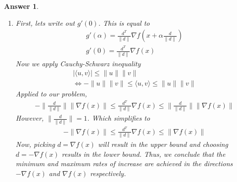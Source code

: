 \documentclass[12pt]{article}
\theoremstyle{colon}
\newtheorem*{answer}{Answer}
\begin{document}
\begin{answer}
\begin{enumerate}[label=\arabic*)]
\begin{enumerate}[label=\alph*)]
          A counterexample of this statement in $C^2$ is $f(x) = x^4$. We have that $x = 0$ is a strict local min since $f(\pm \epsilon) = \epsilon^4 > 0$. However, $\nabla^2 f(0) = 0$ which is not positive definite.
      \end{enumerate}

      \item First, lets write out $g'(0)$. This is equal to
        \begin{gather*}
          g'(\alpha) = \frac{d^T}{\lVert d \rVert} \nabla f \left(x + \alpha \frac{d}{\lVert d \rVert} \right) \\
          g'(0) = \frac{d^T}{\lVert d \rVert} \nabla f(x)
        \end{gather*}
        Now we apply Cauchy-Schwarz inequality
        \begin{gather*}
          \lvert \langle u, v \rangle \rvert \leq \lVert u \rVert \lVert v \rVert \\
          \Longleftrightarrow -\lVert u \rVert \lVert v \rVert \leq \langle u, v \rangle \leq \lVert u \rVert \lVert v \rVert
        \end{gather*}
        Applied to our problem,
        \begin{gather*}
          -\lVert \frac{d}{\lVert d \rVert} \rVert \lVert \nabla f(x) \rVert \leq \frac{d^T}{\lVert d \rVert} \nabla f(x) \leq \lVert \frac{d}{\lVert d \rVert} \rVert \lVert \nabla f(x) \rVert
        \end{gather*}
        However, $\lVert \frac{d}{\lVert d \rVert} \rVert = 1$. Which simplifies to
        \begin{gather*}
          -\lVert \nabla f(x) \rVert \leq \frac{d^T}{\lVert d \rVert} \nabla f(x) \leq \lVert \nabla f(x) \rVert
        \end{gather*}
        Now, picking $d = \nabla f(x)$ will result in the upper bound and choosing $d = - \nabla f(x)$ results in the lower bound. Thus, we conclude that the minimum and maximum rates of increase are achieved in the directions $-\nabla f(x)$ and $\nabla f(x)$ respectively.
  \end{enumerate}
\end{answer}

\clearpage
\end{document}
